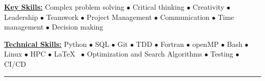 \vspace*{-5mm}
\begin{multicols}{2}
    \begin{spacing}{1}
        \href{.}{\bf Key Skills:}
        Complex problem solving $\bullet$ Critical thinking $\bullet$ Creativity $\bullet$ Leadership $\bullet$ Teamwork $\bullet$ Project Management $\bullet$ Communication $\bullet$ Time management $\bullet$ Decision making

        \href{.}{\bf Technical Skills:}
        Python $\bullet$ SQL $\bullet$ Git $\bullet$ TDD $\bullet$ Fortran $\bullet$ openMP $\bullet$ Bash $\bullet$ Linux $\bullet$ HPC $\bullet$ \LaTeX~ $\bullet$ Optimization and Search Algorithms $\bullet$ Testing $\bullet$ CI/CD
    \end{spacing}
\end{multicols}

\vspace*{-10mm}
\begin{center}
    \par\rule{1.0\textwidth}{0.6pt}
\end{center}
\vspace*{-8mm}